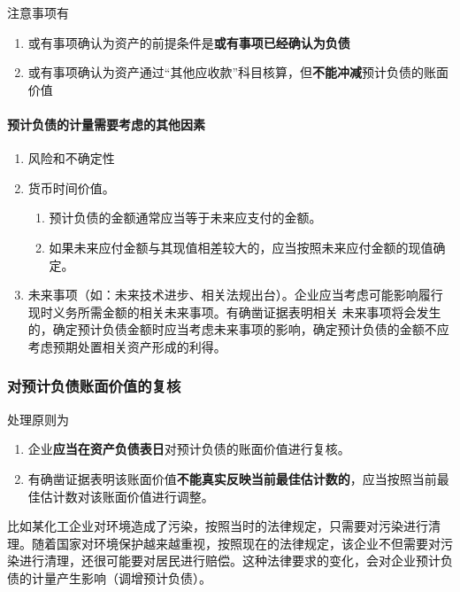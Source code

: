 \documentclass[UTF8,12pt]{ctexart}
\numberwithin{equation}{section} %
\numberwithin{figure}{section}
\numberwithin{table}{section}
\begin{document}
	注意事项有
	\begin{enumerate}
		\item 或有事项确认为资产的前提条件是\textbf{或有事项已经确认为负债}
		
		\item 或有事项确认为资产通过“其他应收款”科目核算，但\textbf{不能冲减}预计负债的账面价值
	\end{enumerate}
	
	\paragraph{预计负债的计量需要考虑的其他因素}
	\begin{enumerate}
		\item 风险和不确定性
		
		\item 货币时间价值。
		\begin{enumerate}
			\item 预计负债的金额通常应当等于未来应支付的金额。
			
			\item 如果未来应付金额与其现值相差较大的，应当按照未来应付金额的现值确定。
		\end{enumerate}
		
		\item 未来事项（如：未来技术进步、相关法规出台）。企业应当考虑可能影响履行现时义务所需金额的相关未来事项。有确凿证据表明相关  未来事项将会发生的，确定预计负债金额时应当考虑未来事项的影响，确定预计负债的金额不应考虑预期处置相关资产形成的利得。
	\end{enumerate}
	
	
	\subsubsection{对预计负债账面价值的复核}
	处理原则为
	\begin{enumerate}
		\item 企业\textbf{应当在资产负债表日}对预计负债的账面价值进行复核。
		
		\item 有确凿证据表明该账面价值\textbf{不能真实反映当前最佳估计数的}，应当按照当前最佳估计数对该账面价值进行调整。
	\end{enumerate}
	
	比如某化工企业对环境造成了污染，按照当时的法律规定，只需要对污染进行清理。随着国家对环境保护越来越重视，按照现在的法律规定，该企业不但需要对污染进行清理，还很可能要对居民进行赔偿。这种法律要求的变化，会对企业预计负债的计量产生影响（调增预计负债）。
	
\end{document}
